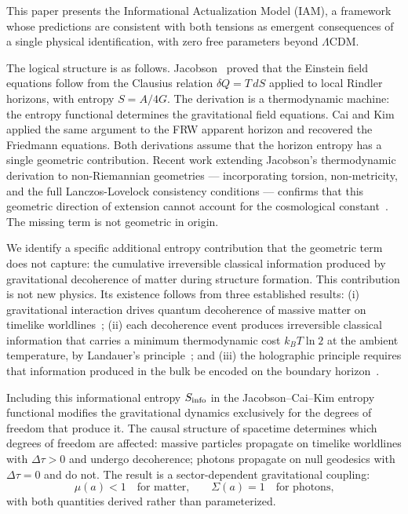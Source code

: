 \documentclass[twocolumn,a4paper,aps,prd,twocolumn,showpacs,notitlepage,superscriptaddress,nofootinbib]{article}
\newcommand{\LCDM}{$\Lambda$CDM}
\begin{document}
This paper presents the Informational Actualization Model (IAM), a framework
whose predictions are consistent with both tensions as emergent consequences of
a single physical identification, with zero free parameters beyond \LCDM{}.

The logical structure is as follows.  Jacobson~\citep{Jacobson1995} proved that
the Einstein field equations follow from the Clausius relation
$\delta Q = T\,dS$ applied to local Rindler horizons, with entropy $S = A/4G$.
The derivation is a thermodynamic machine: the entropy functional determines
the gravitational field equations.  Cai and Kim~\citep{CaiKim2005} applied the
same argument to the FRW apparent horizon and recovered the Friedmann equations.
Both derivations assume that the horizon entropy has a single geometric
contribution.  Recent work extending Jacobson's thermodynamic derivation to
non-Riemannian geometries — incorporating torsion, non-metricity, and the
full Lanczos-Lovelock consistency conditions — confirms that this geometric
direction of extension cannot account for the cosmological
constant~\citep{Martinez2026}.  The missing term is not geometric in origin.

We identify a specific additional entropy contribution that the geometric term
does not capture: the cumulative irreversible classical information produced by
gravitational decoherence of matter during structure formation.  This
contribution is not new physics.  Its existence follows from three established
results: (i) gravitational interaction drives quantum decoherence of massive
matter on timelike worldlines~\citep{Zurek2003}; (ii) each decoherence event
produces irreversible classical information that carries a minimum thermodynamic
cost $k_B T \ln 2$ at the ambient temperature, by Landauer's
principle~\citep{Landauer1961,Berut2012}; and (iii) the holographic principle
requires that information produced in the bulk be encoded on the boundary
horizon~\citep{tHooft1993,Susskind1995}.

Including this informational entropy $S_{\rm info}$ in the Jacobson--Cai--Kim
entropy functional modifies the gravitational dynamics exclusively for the
degrees of freedom that produce it.  The causal structure of spacetime
determines which degrees of freedom are affected: massive particles propagate
on timelike worldlines with $\Delta\tau > 0$ and undergo decoherence; photons
propagate on null geodesics with $\Delta\tau = 0$ and do not.  The result is a
sector-dependent gravitational coupling:
\begin{equation}
  \mu(a) < 1 \quad \text{for matter,} \qquad \Sigma(a) = 1 \quad \text{for
  photons,}
  \label{eq:sector_split}
\end{equation}
with both quantities derived rather than parameterized.
\end{document}
